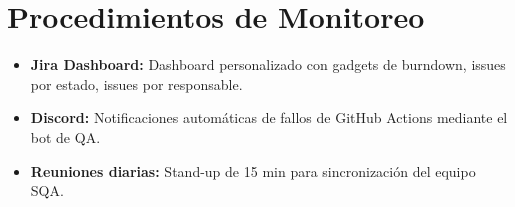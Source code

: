 \section{Procedimientos de Monitoreo}
\label{sec:monitoreo}

\begin{itemize}
    \item \textbf{Jira Dashboard:} Dashboard personalizado con gadgets de burndown, issues por estado, issues por responsable.
    \item \textbf{Discord:} Notificaciones automáticas de fallos de GitHub Actions mediante el bot de QA.
    \item \textbf{Reuniones diarias:} Stand-up de 15 min para sincronización del equipo SQA.
\end{itemize}
